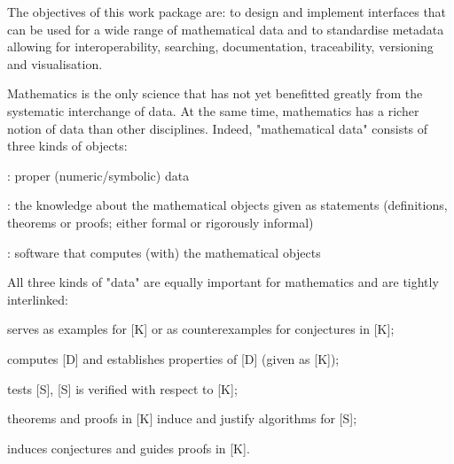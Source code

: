 \begin{workpackage}[id=dksbases,wphases=1-48!.5,
  title=Data/Knowledge/Software-Bases,lead=JU,
  ZHRM=12,JURM=36,USHRM=12,UWRM=3,SARM=10]


\begin{wpobjectives}
  The objectives of this work package are: to design and implement interfaces that can be
  used for a wide range of mathematical data and to standardise metadata allowing for
  interoperability, searching, documentation, traceability, versioning and visualisation.
\end{wpobjectives}


\begin{wpdescription}
  Mathematics is the only science that has not yet benefitted greatly from the systematic
  interchange of data. At the same time, mathematics has a richer notion of data than
  other disciplines.  Indeed, "mathematical data" consists of three kinds of objects:
  \begin{compactitem}
  \item[] [D]: proper (numeric/symbolic) data
  \item[] [K]: the knowledge about the mathematical objects given as statements
    (definitions, theorems or proofs; either formal or rigorously informal)
  \item[] [S] : software that computes (with) the mathematical objects
  \end{compactitem}

  All three kinds of "data" are equally important for mathematics and are tightly
  interlinked:
  \begin{compactitem}
  \item[] [D] serves as examples for [K] or as counterexamples for conjectures in [K];
  \item[] [S] computes [D] and establishes properties of [D] (given as [K]);
  \item[] [D] tests [S], [S] is verified with respect to [K];
  \item[] theorems and proofs in [K] induce and justify algorithms for [S];
  \item[] [D] induces conjectures and guides proofs in [K].
  \end{compactitem}


\end{wpdescription}
\end{workpackage}
